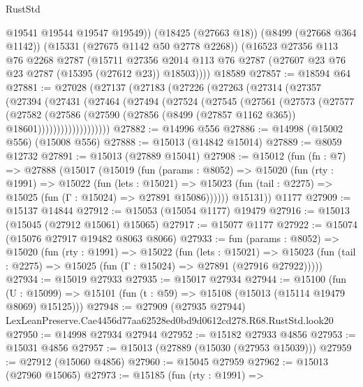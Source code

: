 \begin{lexlean}{RustStd}
\begin{coremodule}
          @19541
          @19544
          @19547
          @19549))
      (@18425 (@27663 @18))
      (@8499 (@27668 @364 @1142))
      (@15331 (@27675 @1142 @50 @2778 @2268))
      (@16523
        @27356
        @113
        @76
        @2268
        @2787
        (@15711
          @27356
          @2014
          @113
          @76
          @2787
          (@27607 @23 @76 @23 @2787 (@15395 (@27612 @23)) @18503))))
    @18589
@27857 := @18594 @64
@27881 := @27028
    (@27137
      (@27183
        (@27226
          (@27263
            (@27314
              (@27357
                (@27394
                  (@27431
                    (@27464
                      (@27494
                        (@27524
                          (@27545
                            (@27561
                              (@27573
                                (@27577
                                  (@27582
                                    (@27586
                                      (@27590
                                        (@27856
                                          (@8499 (@27857 @1162 @365))
                                          @18601)))))))))))))))))))
@27882 := @14996 @556
@27886 := @14998 (@15002 @556) (@15008 @556)
@27888 := @15013 (@14842 @15014)
@27889 := @8059 @12732
@27891 := @15013 (@27889 @15041)
@27908 := @15012
    (fun (fn : @7) =>
    @27888
      (@15017
        (@15019
          (fun (params : @8052) =>
          @15020
            (fun (rty : @1991) =>
            @15022
              (fun (lets : @15021) =>
              @15023 (fun (tail : @2275) => @15025 (fun (Γ : @15024) => @27891 @15086))))))
        @15131))
    @1177
@27909 := @15137 @14844
@27912 := @15053 (@15054 @1177) @19479
@27916 := @15013 (@15045 (@27912 @15061) @15065)
@27917 := @15077 @1177
@27922 := @15074 (@15076 @27917 @19482 @8063 @8066)
@27933 := fun (params : @8052) =>
  @15020
    (fun (rty : @1991) =>
    @15022
      (fun (lets : @15021) =>
      @15023 (fun (tail : @2275) => @15025 (fun (Γ : @15024) => @27891 (@27916 @27922)))))
@27934 := @15019 @27933
@27935 := @15017 @27934
@27944 := @15100
    (fun (U : @15099) => @15101 (fun (t : @59) => @15108 (@15013 (@15114 @19479 @8069) @15125)))
@27948 := @27909
    (@27935 @27944)
    LexLeanPreserve.Cae4456d77aa62528ed0bd9d0612cd278.R68.RustStd.look20
@27950 := @14998 @27934 @27944
@27952 := @15182 @27933 @4856
@27953 := @15031 @4856
@27957 := @15013 (@27889 (@15030 (@27953 @15039)))
@27959 := @27912 (@15060 @4856)
@27960 := @15045 @27959
@27962 := @15013 (@27960 @15065)
@27973 := @15185
    (fun (rty : @1991) =>

\end{coremodule}
\end{lexlean}
